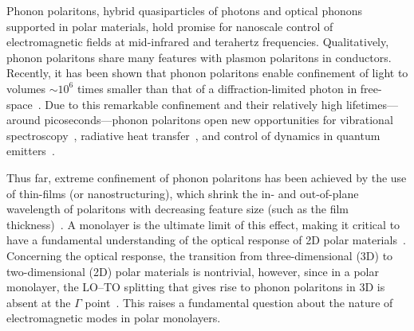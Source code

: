 \documentclass[aps,prb,twocolumn,
	           groupedaddress,superscriptaddress,
               amsfonts,amssymb,amsmath,floatfix,
	           citeautoscript]{revtex4-1}
\begin{document}
Phonon polaritons, hybrid quasiparticles of photons and optical phonons supported in polar materials, hold promise for nanoscale control of electromagnetic fields at mid-infrared and terahertz frequencies. Qualitatively, phonon polaritons share many features with plasmon polaritons in conductors. Recently, it has been shown that phonon polaritons enable confinement of light to volumes  $\sim10^6$ times smaller than that of a diffraction-limited photon in free-space~\cite{caldwell2013low,xu2014mid,caldwell2014sub,dai2014tunable,tomadin2015accessing,yoxall2015direct,li2015hyperbolic,dai2015subdiffractional,dai2015graphene,caldwell2015low,li2016reversible,Basov:2016,basov2017towards,low2017polaritons,giles2017ultra,li2018infrared,ma2018plane}. Due to this remarkable confinement and their relatively high lifetimes---around picoseconds---phonon polaritons open new opportunities for vibrational spectroscopy~\cite{autore2018boron}, radiative heat transfer~\cite{hillenbrand2002phonon}, and control of dynamics in quantum emitters~\cite{kumar2015tunable,rivera2017making,kurman2018control,flick2018strong}. 

Thus far, extreme confinement of phonon polaritons has been achieved by the use of thin-films (or nanostructuring), which shrink the in- and out-of-plane wavelength of polaritons with decreasing feature size (such as the film thickness)~\cite{dai2014tunable,dubrovkin2018ultra}. A monolayer is the ultimate limit of this effect, making it critical to have a fundamental understanding of the optical response of 2D polar materials~\cite{thygesen2017calculating}. Concerning the optical response, the transition from three-dimensional (3D) to two-dimensional (2D) polar materials is nontrivial, however, since in a polar monolayer, the LO--TO splitting that gives rise to phonon polaritons in 3D is absent at the $\Gamma$ point~\cite{sanchez2002vibrational,mele2002electric,serrano2007vibrational,sohier2017breakdown}. This raises a fundamental question about the nature of  electromagnetic modes in polar monolayers. 
\end{document}
